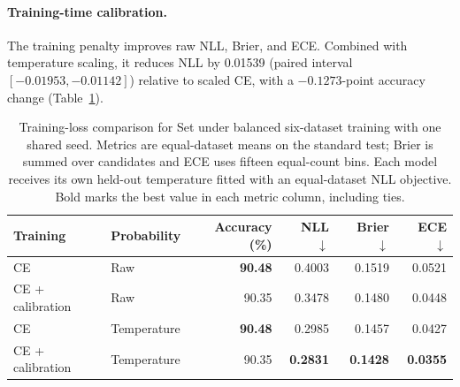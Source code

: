 \paragraph{Training-time calibration.}
The training penalty improves raw NLL, Brier, and ECE. Combined with temperature scaling, it reduces NLL by 0.01539 (paired interval $[-0.01953,-0.01142]$) relative to scaled CE, with a $-0.1273$-point accuracy change (Table~\ref{tab:training-calibration}).
\begin{table}[htbp]
\centering\small
\begin{tabular}{llrrrr}
\toprule
Training & Probability & Accuracy (\%) & NLL $\downarrow$ & Brier $\downarrow$ & ECE $\downarrow$ \\
\midrule
CE & Raw & \textbf{90.48} & 0.4003 & 0.1519 & 0.0521 \\
CE + calibration & Raw & 90.35 & 0.3478 & 0.1480 & 0.0448 \\
CE & Temperature & \textbf{90.48} & 0.2985 & 0.1457 & 0.0427 \\
CE + calibration & Temperature & 90.35 & \textbf{0.2831} & \textbf{0.1428} & \textbf{0.0355} \\
\bottomrule
\end{tabular}
\caption{Training-loss comparison for Set under balanced six-dataset training with one shared seed. Metrics are equal-dataset means on the standard test; Brier is summed over candidates and ECE uses fifteen equal-count bins. Each model receives its own held-out temperature fitted with an equal-dataset NLL objective. Bold marks the best value in each metric column, including ties.}
\label{tab:training-calibration}
\end{table}
